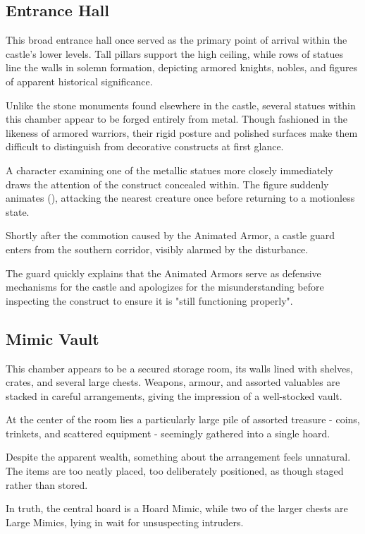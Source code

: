 \subsection*{ Entrance Hall}
{\entryfont This broad entrance hall once served as the primary point of arrival within the castle’s lower levels. Tall pillars support the high ceiling, while rows of statues line the walls in solemn formation, depicting armored knights, nobles, and figures of apparent historical significance.

Unlike the stone monuments found elsewhere in the castle, several statues within this chamber appear to be forged entirely from metal. Though fashioned in the likeness of armored warriors, their rigid posture and polished surfaces make them difficult to distinguish from decorative constructs at first glance.

A character examining one of the metallic statues more closely immediately draws the attention of the construct concealed within. The figure suddenly animates (\hyperref[monster:AnimatedArmor]{}), attacking the nearest creature once before returning to a motionless state.

Shortly after the commotion caused by the Animated Armor, a castle guard enters from the southern corridor, visibly alarmed by the disturbance.

The guard quickly explains that the Animated Armors serve as defensive mechanisms for the castle and apologizes for the misunderstanding before inspecting the construct to ensure it is "still functioning properly".}
\subsection*{ Mimic Vault}
{\entryfont This chamber appears to be a secured storage room, its walls lined with shelves, crates, and several large chests. Weapons, armour, and assorted valuables are stacked in careful arrangements, giving the impression of a well-stocked vault.

At the center of the room lies a particularly large pile of assorted treasure - coins, trinkets, and scattered equipment - seemingly gathered into a single hoard.

Despite the apparent wealth, something about the arrangement feels unnatural. The items are too neatly placed, too deliberately positioned, as though staged rather than stored.

In truth, the central hoard is a Hoard Mimic, while two of the larger chests are Large Mimics, lying in wait for unsuspecting intruders.}
